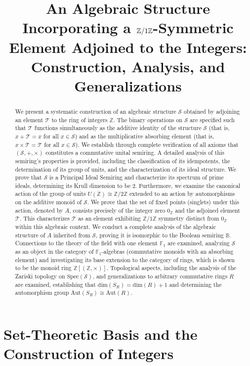 \documentclass[11pt, a4paper]{article}
\title{An Algebraic Structure Incorporating a \texorpdfstring{$\Zone$}{Z/1Z}-Symmetric Element Adjoined to the Integers: Construction, Analysis, and Generalizations}
\author{}
\date{}
\theoremstyle{plain}
\theoremstyle{definition}
\numberwithin{equation}{section}
\newcommand{\Z}{\mathbb{Z}}
\newcommand{\Tobj}{\mathcal{T}} %
\newcommand{\SemiringS}{\mathcal{S}}
\newcommand{\Ztwo}{\mathbb{Z}/2\mathbb{Z}}
\newcommand{\Zone}{\mathbb{Z}/1\mathbb{Z}}
\newcommand{\Aut}{\mathrm{Aut}}
\newcommand{\SR}{S_{R}}
\newcommand{\Spec}{\mathrm{Spec}}
\newcommand{\KrullDim}{\mathrm{dim}}
\newcommand{\Bool}{\mathbb{B}}
\newcommand{\FOne}{\mathbb{F}_1}
\begin{document}
\maketitle

\begin{abstract}
We present a systematic construction of an algebraic structure $\SemiringS$ obtained by adjoining an element $\Tobj$ to the ring of integers $\Z$. The binary operations on $\SemiringS$ are specified such that $\Tobj$ functions simultaneously as the additive identity of the structure $\SemiringS$ (that is, $x+\Tobj=x$ for all $x\in\SemiringS$) and as the multiplicative absorbing element (that is, $x\times\Tobj=\Tobj$ for all $x\in\SemiringS$). We establish through complete verification of all axioms that $(\SemiringS, +, \times)$ constitutes a commutative unital semiring. A detailed analysis of this semiring's properties is provided, including the classification of its idempotents, the determination of its group of units, and the characterization of its ideal structure. We prove that $\SemiringS$ is a Principal Ideal Semiring and characterize its spectrum of prime ideals, determining its Krull dimension to be 2. Furthermore, we examine the canonical action of the group of units $U(\Z) \cong \Ztwo$ extended to an action by automorphisms on the additive monoid of $\SemiringS$. We prove that the set of fixed points (singlets) under this action, denoted by $A$, consists precisely of the integer zero $0_{\Z}$ and the adjoined element $\Tobj$. This characterizes $\Tobj$ as an element exhibiting $\Zone$ symmetry distinct from $0_{\Z}$ within this algebraic context. We conduct a complete analysis of the algebraic structure of $A$ inherited from $\SemiringS$, proving it is isomorphic to the Boolean semiring $\Bool$. Connections to the theory of the field with one element $\FOne$ are examined, analyzing $\SemiringS$ as an object in the category of $\FOne$-algebras (commutative monoids with an absorbing element) and investigating its base extension to the category of rings, which is shown to be the monoid ring $\Z[(\Z, \times)]$. Topological aspects, including the analysis of the Zariski topology on $\Spec(\SemiringS)$, and generalizations to arbitrary commutative rings $R$ are examined, establishing that $\KrullDim(\SR) = \KrullDim(R)+1$ and determining the automorphism group $\Aut(\SR) \cong \Aut(R)$.
\end{abstract}

\tableofcontents

\section{Set-Theoretic Basis and the Construction of Integers}
\end{document}
